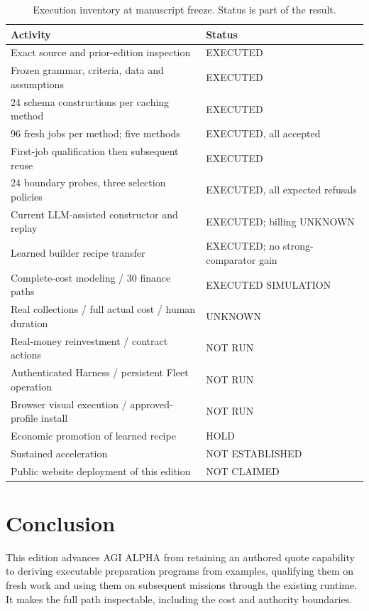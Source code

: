\documentclass[11pt,letterpaper]{article}
\begin{document}
\begin{table}[htbp]
\small
\caption{Execution inventory at manuscript freeze. Status is part of the result.}
\label{tab:status}
\begin{tabularx}{\textwidth}{@{}YP{.28\textwidth}@{}}\toprule
Activity & Status\\\midrule
Exact source and prior-edition inspection & EXECUTED\\
Frozen grammar, criteria, data and assumptions & EXECUTED\\
24 schema constructions per caching method & EXECUTED\\
96 fresh jobs per method; five methods & EXECUTED, all accepted\\
First-job qualification then subsequent reuse & EXECUTED\\
24 boundary probes, three selection policies & EXECUTED, all expected refusals\\
Current LLM-assisted constructor and replay & EXECUTED; billing UNKNOWN\\
Learned builder recipe transfer & EXECUTED; no strong-comparator gain\\
Complete-cost modeling / 30 finance paths & EXECUTED SIMULATION\\
Real collections / full actual cost / human duration & UNKNOWN\\
Real-money reinvestment / contract actions & NOT RUN\\
Authenticated Harness / persistent Fleet operation & NOT RUN\\
Browser visual execution / approved-profile install & NOT RUN\\
Economic promotion of learned recipe & HOLD\\
Sustained acceleration & NOT ESTABLISHED\\
Public website deployment of this edition & NOT CLAIMED\\\bottomrule
\end{tabularx}
\end{table}

\section{Conclusion}

This edition advances AGI ALPHA from retaining an authored quote capability to deriving executable preparation programs from examples, qualifying them on fresh work and using them on subsequent missions through the existing runtime. It makes the full path inspectable, including the cost and authority boundaries.
\end{document}
